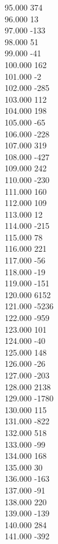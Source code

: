 { 95.000	374 \\
 96.000	13 \\
 97.000	-133 \\
 98.000	51 \\
 99.000	-41 \\
 100.000	162 \\
 101.000	-2 \\
 102.000	-285 \\
 103.000	112 \\
 104.000	198 \\
 105.000	-65 \\
 106.000	-228 \\
 107.000	319 \\
 108.000	-427 \\
 109.000	242 \\
 110.000	-230 \\
 111.000	160 \\
 112.000	109 \\
 113.000	12 \\
 114.000	-215 \\
 115.000	78 \\
 116.000	221 \\
 117.000	-56 \\
 118.000	-19 \\
 119.000	-151 \\
 120.000	6152 \\
 121.000	-5236 \\
 122.000	-959 \\
 123.000	101 \\
 124.000	-40 \\
 125.000	148 \\
 126.000	-26 \\
 127.000	-203 \\
 128.000	2138 \\
 129.000	-1780 \\
 130.000	115 \\
 131.000	-822 \\
 132.000	518 \\
 133.000	-99 \\
 134.000	168 \\
 135.000	30 \\
 136.000	-163 \\
 137.000	-91 \\
 138.000	220 \\
 139.000	-139 \\
 140.000	284 \\
 141.000	-392 \\
}
